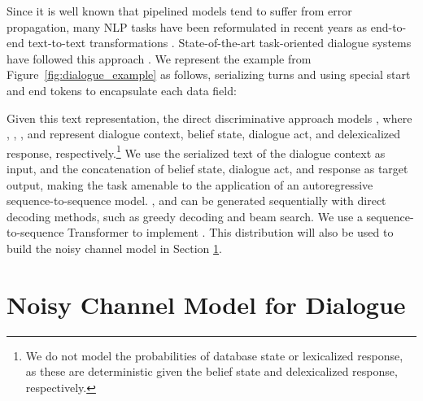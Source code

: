 \documentclass[11pt,a4paper]{article}
\begin{document}
Since it is well known that pipelined models tend to suffer from error propagation, many NLP tasks have been reformulated in recent years as end-to-end text-to-text transformations \cite{raffel2019exploring,brown2020language}. State-of-the-art task-oriented dialogue systems have followed this approach \cite{hosseini2020simple,peng2020few}.
We represent the example from Figure~\ref{fig:dialogue_example} as follows, serializing turns and using special start and end tokens to encapsulate each data field:
\noindent{}

Given this text representation, the direct discriminative approach models , where , , , and  represent dialogue context, belief state, dialogue act, and delexicalized response, respectively.\footnote{We do not model the probabilities of database state or lexicalized response, as these are deterministic given the belief state and delexicalized response, respectively.} We use the serialized text of the dialogue context as input, and the concatenation of belief state, dialogue act, and response as target output, making the task amenable to the application of an autoregressive sequence-to-sequence model.
,  and  can be generated sequentially with direct decoding methods, such as greedy decoding and beam search. We use a sequence-to-sequence Transformer \cite{vaswani2017attention} to implement . 
This distribution will also be used to build the noisy channel model in Section \ref{sec-model}.




\section{Noisy Channel Model for Dialogue}
\label{sec-model}
\end{document}
